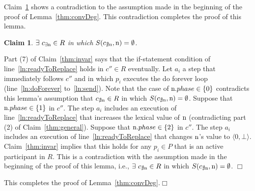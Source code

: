 \documentclass[11pt]{article}
\newtheorem{claim}[theorem]{Claim}
\newenvironment{proof}{\noindent{\bf Proof.}}{\hfill$\Box$}
\begin{document}
\begin{proof}
\medskip


Claim~\ref{thm:contra} shows a contradiction to the assumption made in the beginning of the proof of Lemma~\ref{thm:convDeg}. 
This contradiction completes the proof of this lemma.

\begin{claim}
\label{thm:contra}
$\exists ~c_{\exists \textnormal{n}} \in R$ in which $S(c_{\nexists \textnormal{n}},\textnormal{n})=\emptyset$.
\end{claim}
\begin{proof}
Part (7) of Claim~\ref{thm:invar} says that the if-statement condition of line~\ref{ln:readyToReplace} holds in $c'' \in R$ eventually. Let $a_i$ a step that immediately follows $c''$ and in which $p_i$ executes the do forever loop (line~\ref{ln:doForever} to~\ref{ln:send}).
Note that the case of $\textnormal{n}.phase\in \{ 0\}$ contradicts this lemma's assumption that $c_{\nexists \textnormal{n}} \in R$ in which $S(c_{\nexists \textnormal{n}},\textnormal{n})=\emptyset$.
Suppose that $\textnormal{n}.phase\in \{ 1 \}$ in $c''$. The step $a_i$ includes an execution of line~\ref{ln:readyToReplace} that increases the lexical value of $\textnormal{n}$ (contradicting part (2) of Claim~\ref{thm:general}).
Suppose that $\textnormal{n}.phase\in \{ 2 \}$ in $c''$. The step $a_i$ includes an execution of line~\ref{ln:readyToReplace} that changes $\textnormal{n}$'s value to $\langle 0, \bot \rangle$. Claim~\ref{thm:invar} implies that this holds for any $p_i \in P$ that is an active participant in $R$. This is a contradiction with the assumption made in the beginning of the proof of this lemma, i.e.,  
$\exists ~c_{\nexists \textnormal{n}} \in R$ in which $S(c_{\nexists \textnormal{n}},\textnormal{n})=\emptyset$.
\end{proof}

\medskip

\noindent This completes the proof of Lemma~\ref{thm:convDeg}.\hfill\end{proof}
\end{document}
